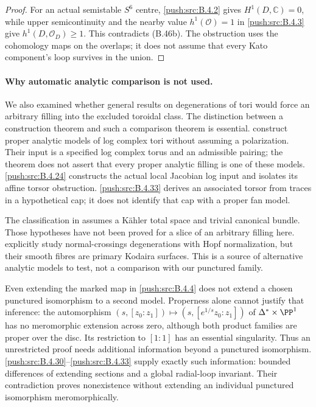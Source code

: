 \begin{proof}
For an actual semistable $S^6$ centre, \ref{push:src:B.4.2} gives
$H^1(D,\mathbb C)=0$, while upper semicontinuity
and the nearby value $h^1(\mathcal O)=1$ in \ref{push:src:B.4.3}
give $h^1(D,\mathcal O_D)\geq1$. This contradicts
(B.46b). The obstruction uses the cohomology maps
on the overlaps; it does not assume that every
Kato component's loop survives in the union.
\end{proof}


\paragraph{Why automatic analytic comparison is not used.}
We also examined whether general results on degenerations of tori
would force an arbitrary filling into the excluded toroidal class.
The distinction between a construction theorem and such a comparison
theorem is essential. \citet[Theorem 5.1.3 and Sections 5.2--5.4]
{KKN2008Root} construct proper analytic models of log complex tori
without assuming a polarization. Their input is a specified log
complex torus and an admissible pairing; the theorem does not assert
that every proper analytic filling is one of these models.
\ref{push:src:B.4.24} constructs the actual local Jacobian log input and isolates
its affine torsor obstruction. \ref{push:src:B.4.33} derives an associated torsor
from traces in a hypothetical cap; it does not identify that cap
with a proper fan model.

The classification in \citet[Theorem 3.1]{KamenovaToriRoot} assumes
a K\"ahler total space and trivial canonical bundle. Those hypotheses
have not been proved for a slice of an arbitrary filling here.
\citet[Section 3, Proposition 3.1]{SchroeerSiebert2002Root} explicitly
study normal-crossings degenerations with Hopf normalization, but
their smooth fibres are primary Kodaira surfaces. This is a source
of alternative analytic models to test, not a comparison with our
punctured family.

Even extending the marked map in \ref{push:src:B.4.4} does not extend a chosen
punctured isomorphism to a second model. Properness alone cannot
justify that inference: the automorphism
$(s,[z_0:z_1])\mapsto(s,[e^{1/s}z_0:z_1])$ of
$\Delta^*\times\PP^1$ has no meromorphic extension across zero,
although both product families are proper over the disc. Its
restriction to $[1:1]$ has an essential singularity. Thus an
unrestricted proof needs additional information beyond a
punctured isomorphism. \ref{push:src:B.4.30}--\ref{push:src:B.4.33} supply exactly such information:
bounded differences of extending sections and a global radial-loop
invariant. Their contradiction proves nonexistence without extending
an individual punctured isomorphism meromorphically.



